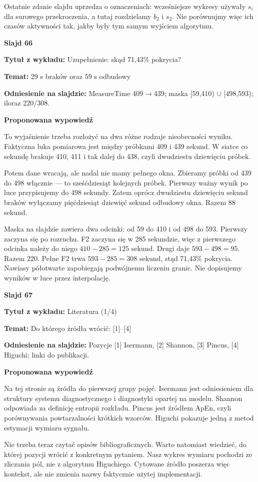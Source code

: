 \documentclass[a4paper,11pt]{article}
\newcommand{\NumerSlajdu}{1}
\newcommand{\Komentarz}[3]{%
  \gdef\NumerSlajdu{#1}%
  {\Large\bfseries Slajd #1\par}\smallskip
  \textbf{Tytuł z wykładu:} #2\par
  \textbf{Temat:} #3\par\medskip
}
\begin{document}
Ostatnie zdanie slajdu uprzedza o oznaczeniach: wcześniejsze wykresy używały $s_i$ dla surowego przekroczenia, a tutaj rozdzielamy $b_2$ i $s_2$. Nie porównujmy więc ich czasów aktywności tak, jakby były tym samym wyjściem algorytmu.
\clearpage

\Komentarz{66}{Uzupełnienie: skąd 71,43\% pokrycia?}{29 s braków oraz 59 s odbudowy}
{\small\color{black!65}\textbf{Odniesienie na slajdzie:} MeasureTime 409\ensuremath{\to}439; maska [59,410) \ensuremath{\cup} [498,593); iloraz 220/308.\par}
\medskip
\textbf{Proponowana wypowiedź}\par
To wyjaśnienie trzeba rozłożyć na dwa różne rodzaje nieobecności wyniku. Faktyczna luka pomiarowa jest między próbkami 409 i 439 sekund. W siatce co sekundę brakuje 410, 411 i tak dalej do 438, czyli dwudziestu dziewięciu próbek.

Potem dane wracają, ale nadal nie mamy pełnego okna. Zbieramy próbki od 439 do 498 włącznie — to sześćdziesiąt kolejnych próbek. Pierwszy ważny wynik po luce przypisujemy do 498 sekundy. Zatem oprócz dwudziestu dziewięciu sekund braków wyłączamy pięćdziesiąt dziewięć sekund odbudowy okna. Razem 88 sekund.

Maska na slajdzie zawiera dwa odcinki: od 59 do 410 i od 498 do 593. Pierwszy zaczyna się po rozruchu. F2 zaczyna się w 285 sekundzie, więc z pierwszego odcinka należy do niego $410-285=125$ sekund. Drugi daje $593-498=95$. Razem 220. Pełne F2 trwa $593-285=308$ sekund, stąd 71,43\% pokrycia. Nawiasy półotwarte zapobiegają podwójnemu liczeniu granic. Nie dopisujemy wyników w luce przez interpolację.
\clearpage

\Komentarz{67}{Literatura (1/4)}{Do którego źródła wrócić: [1]–[4]}
{\small\color{black!65}\textbf{Odniesienie na slajdzie:} Pozycje [1] Isermann, [2] Shannon, [3] Pincus, [4] Higuchi; linki do publikacji.\par}
\medskip
\textbf{Proponowana wypowiedź}\par
Na tej stronie są źródła do pierwszej grupy pojęć. Isermann jest odniesieniem dla struktury systemu diagnostycznego i diagnostyki opartej na modelu. Shannon odpowiada za definicję entropii rozkładu. Pincus jest źródłem ApEn, czyli porównywania powtarzalności krótkich wzorców. Higuchi pokazuje jedną z metod estymacji wymiaru sygnału.

Nie trzeba teraz czytać opisów bibliograficznych. Warto natomiast wiedzieć, do której pozycji wrócić z konkretnym pytaniem. Nasz wykres wymiaru pochodzi ze zliczania pól, nie z algorytmu Higuchiego. Cytowane źródło poszerza więc kontekst, ale nie zmienia nazwy faktycznie użytej implementacji.
\clearpage
\end{document}

